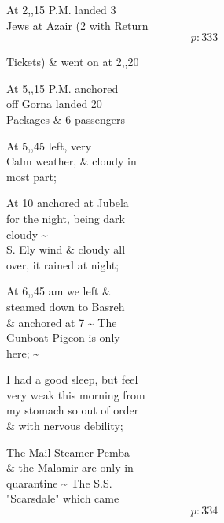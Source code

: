 \documentclass{report}
\begin{document}
	\par{
 	At 2,,15 P.M. landed 3\ \\Jews at Azair (2 with Return\ \\
  \[p: 333 \]

	}


	\par{
 	Tickets) \& went on at 2,,20\ \\
	}

	\par{
 	At 5,,15 P.M. anchored\ \\off Gorna landed 20\ \\Packages \& 6 passengers\ \\
	}

	\par{
 	At 5,,45 left, very\ \\Calm weather, \& cloudy in\ \\most part;\ \\
	}

	\par{
 	At 10 anchored at Jubela\ \\for the night, being dark\ \\cloudy \~{}\ \\S. Ely wind \& cloudy all\ \\over, it rained at night;\ \\
	}

	\par{
 	At 6,,45 am we left \&\ \\steamed down to Basreh\ \\\& anchored at 7 \~{} The\ \\Gunboat Pigeon is only\ \\here; \~{}\ \\
	}

	\par{
 	I had a good sleep, but feel\ \\very weak this morning from\ \\my stomach so out of order\ \\\& with nervous debility;\ \\
	}

	\par{
 	The Mail Steamer Pemba\ \\\& the Malamir are only in\ \\quarantine \~{} The S.S.\ \\"Scarsdale" which came\ \\
  \[p: 334 \]

	}
\end{document}
